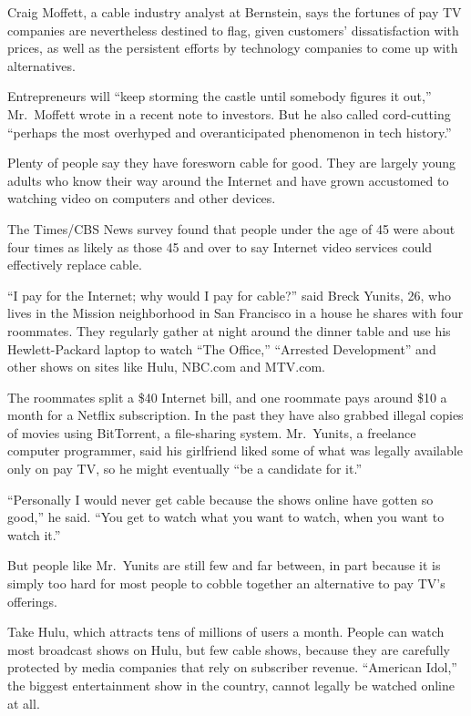﻿\documentclass[12pt]{article}
\begin{document}
Craig Moffett, a cable industry analyst at Bernstein, says the fortunes of pay TV companies are
nevertheless destined to flag, given customers' dissatisfaction with prices, as well as the
persistent efforts by technology companies to come up with alternatives.

Entrepreneurs will ``keep storming the castle until somebody figures it out,'' Mr.~Moffett wrote in
a recent note to investors. But he also called cord-cutting ``perhaps the most overhyped and
overanticipated phenomenon in tech history.''

Plenty of people say they have foresworn cable for good. They are largely young adults who know
their way around the Internet and have grown accustomed to watching video on computers and other
devices.

The Times/CBS News survey found that people under the age of 45 were about four times as likely as
those 45 and over to say Internet video services could effectively replace cable.

``I pay for the Internet; why would I pay for cable?'' said Breck Yunits, 26, who lives in the
Mission neighborhood in San Francisco in a house he shares with four roommates. They regularly
gather at night around the dinner table and use his Hewlett-Packard laptop to watch ``The Office,''
``Arrested Development'' and other shows on sites like Hulu, NBC.com and MTV.com.

The roommates split a \$40 Internet bill, and one roommate pays around \$10 a month for a Netflix
subscription. In the past they have also grabbed illegal copies of movies using BitTorrent, a
file-sharing system. Mr.~Yunits, a freelance computer programmer, said his girlfriend liked some of
what was legally available only on pay TV, so he might eventually ``be a candidate for it.''

``Personally I would never get cable because the shows online have gotten so good,'' he said. ``You
get to watch what you want to watch, when you want to watch it.''

But people like Mr.~Yunits are still few and far between, in part because it is simply too hard for
most people to cobble together an alternative to pay TV's offerings.

Take Hulu, which attracts tens of millions of users a month. People can watch most broadcast shows
on Hulu, but few cable shows, because they are carefully protected by media companies that rely on
subscriber revenue. ``American Idol,'' the biggest entertainment show in the country, cannot legally
be watched online at all.
\end{document}
